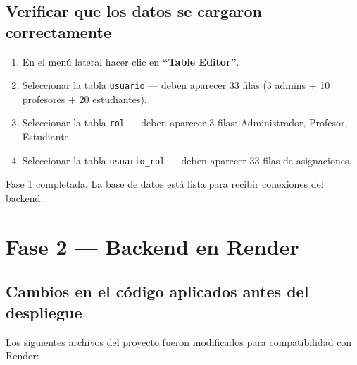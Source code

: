 \documentclass[12pt, a4paper]{article}
\newcommand{\cmd}[1]{\texttt{#1}}
\begin{document}
\subsection{Verificar que los datos se cargaron correctamente}

\begin{enumerate}
    \item En el menú lateral hacer clic en \textbf{``Table Editor''}.
    \item Seleccionar la tabla \cmd{usuario} --- deben aparecer 33 filas (3 admins + 10 profesores + 20 estudiantes).
    \item Seleccionar la tabla \cmd{rol} --- deben aparecer 3 filas: Administrador, Profesor, Estudiante.
    \item Seleccionar la tabla \cmd{usuario\_rol} --- deben aparecer 33 filas de asignaciones.
\end{enumerate}

\begin{nota}
    Fase 1 completada. La base de datos está lista para recibir conexiones del backend.
\end{nota}

\newpage
\section{Fase 2 --- Backend en Render}

\subsection{Cambios en el código aplicados antes del despliegue}

Los siguientes archivos del proyecto fueron modificados para compatibilidad con Render:
\end{document}
